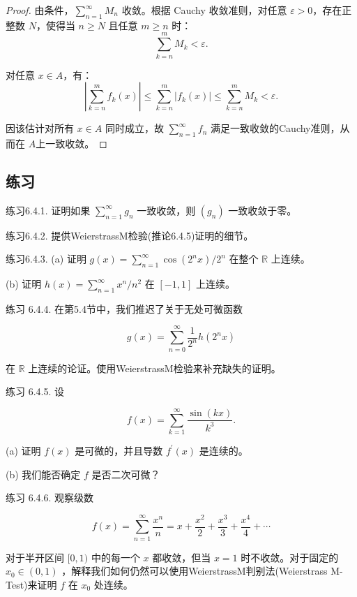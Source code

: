 \begin{proof}
由条件，\(\sum_{n=1}^\infty M_n\) 收敛。根据 Cauchy 收敛准则，对任意 \(\varepsilon > 0\)，存在正整数 \(N\)，使得当 \(n \geq N\) 且任意 \(m \geq n\) 时：
\[
\sum_{k=n}^m M_k < \varepsilon.
\]

对任意 \(x \in A\)，有：
\[
\left| \sum_{k=n}^m f_k(x) \right| \leq \sum_{k=n}^m \left| f_k(x) \right| \leq \sum_{k=n}^m M_k < \varepsilon.
\]

因该估计对所有 \(x \in A\) 同时成立，故 \(\sum_{n=1}^\infty f_n\) 满足一致收敛的Cauchy准则，从而在 \(A\)上一致收敛。
\end{proof}


\subsection{练习}

练习6.4.1. 证明如果 \(\mathop{\sum }\limits_{{n = 1}}^{\infty }{g}_{n}\) 一致收敛，则 \(\left( {g}_{n}\right)\) 一致收敛于零。

练习6.4.2. 提供WeierstrassM检验(推论6.4.5)证明的细节。

练习6.4.3. (a) 证明 \(g\left( x\right)  = \mathop{\sum }\limits_{{n = 1}}^{\infty }\cos \left( {{2}^{n}x}\right) /{2}^{n}\) 在整个 \(\mathbb{R}\) 上连续。

(b) 证明 \(h\left( x\right)  = \mathop{\sum }\limits_{{n = 1}}^{\infty }{x}^{n}/{n}^{2}\) 在 \(\left\lbrack  {-1,1}\right\rbrack\) 上连续。

练习 6.4.4. 在第5.4节中，我们推迟了关于无处可微函数

\[
g\left( x\right)  = \mathop{\sum }\limits_{{n = 0}}^{\infty }\frac{1}{{2}^{n}}h\left( {{2}^{n}x}\right)
\]

在 \(\mathbb{R}\) 上连续的论证。使用WeierstrassM检验来补充缺失的证明。

练习 6.4.5. 设

\[
f\left( x\right)  = \mathop{\sum }\limits_{{k = 1}}^{\infty }\frac{\sin \left( {kx}\right) }{{k}^{3}}.
\]

(a) 证明 \(f\left( x\right)\) 是可微的，并且导数 \({f}^{\prime }\left( x\right)\) 是连续的。

(b) 我们能否确定 \(f\) 是否二次可微？

练习 6.4.6. 观察级数

\[
f\left( x\right)  = \mathop{\sum }\limits_{{n = 1}}^{\infty }\frac{{x}^{n}}{n} = x + \frac{{x}^{2}}{2} + \frac{{x}^{3}}{3} + \frac{{x}^{4}}{4} + \cdots
\]

对于半开区间 \(\lbrack 0,1)\) 中的每一个 \(x\) 都收敛，但当 \(x = 1\) 时不收敛。对于固定的 \({x}_{0} \in  \left( {0,1}\right)\) ，解释我们如何仍然可以使用WeierstrassM判别法(Weierstrass M-Test)来证明 \(f\) 在 \({x}_{0}\) 处连续。

